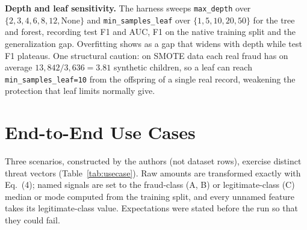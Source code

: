 \documentclass[conference]{IEEEtran}
\begin{document}
\textbf{Depth and leaf sensitivity.} The harness sweeps \texttt{max\_\allowbreak{}depth} over $\{2,3,4,6,8,12,\text{None}\}$ and \texttt{min\_\allowbreak{}samples\_\allowbreak{}leaf} over $\{1,5,10,20,50\}$ for the tree and forest, recording test F1 and AUC, F1 on the native training split and the generalization gap. Overfitting shows as a gap that widens with depth while test F1 plateaus. One structural caution: on SMOTE data each real fraud has on average $13{,}842/3{,}636=3.81$ synthetic children, so a leaf can reach \texttt{min\_\allowbreak{}samples\_\allowbreak{}leaf=10} from the offspring of a single real record, weakening the protection that leaf limits normally give.

\section{End-to-End Use Cases}\label{sec:usecases}
Three scenarios, constructed by the authors (not dataset rows), exercise distinct threat vectors (Table~\ref{tab:usecase}). Raw amounts are transformed exactly with Eq.~(4); named signals are set to the fraud-class (A, B) or legitimate-class (C) median or mode computed from the training split, and every unnamed feature takes its legitimate-class value. Expectations were stated before the run so that they could fail.
\end{document}
